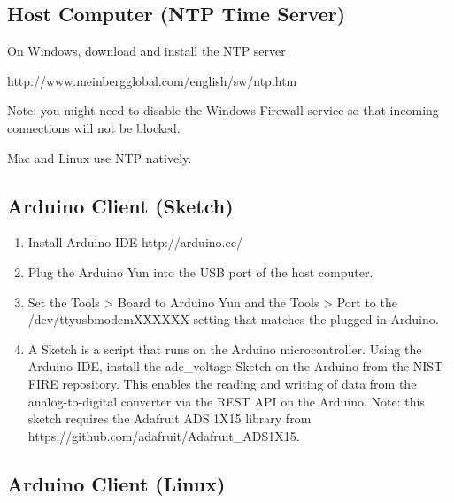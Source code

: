 \documentclass[11pt,oneside]{book}
\begin{document}
\subsection{Host Computer (NTP Time Server)}

On Windows, download and install the NTP server

http://www.meinbergglobal.com/english/sw/ntp.htm

Note: you might need to disable the Windows Firewall service so that incoming connections will not be blocked.

Mac and Linux use NTP natively.

\subsection{Arduino Client (Sketch)}

\begin{enumerate}
\item Install Arduino IDE
http://arduino.cc/
\item Plug the Arduino Yun into the USB port of the host computer.
\item Set the Tools > Board to Arduino Yun and the Tools > Port to the /dev/ttyusbmodemXXXXXX setting that matches the plugged-in Arduino.
\item A Sketch is a script that runs on the Arduino microcontroller. Using the Arduino IDE, install the adc\_voltage Sketch on the Arduino from the NIST-FIRE repository. This enables the reading and writing of data from the analog-to-digital converter via the REST API on the Arduino. Note: this sketch requires the Adafruit ADS 1X15 library from https://github.com/adafruit/Adafruit\_ADS1X15.
\end{enumerate}

\subsection{Arduino Client (Linux)}
\end{document}
